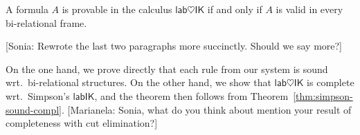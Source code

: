 \documentclass[twoside]{aiml18}
\newcommand{\marianela}[1]{{\color{purple}[Marianela: #1]}}
\newcommand{\sonia}[1]{{\color{blue}[Sonia: #1]}}
\newcommand*{\lab}{\mathsf{lab}}
\newcommand*{\IK}{\mathsf{IK}}
\newcommand*{\TOP}{\mathord{\top}}
\newcommand*{\BOT}{\mathord{\bot}}
\newcommand*{\labels}[2]{{\color{blue}{#1}\:\colon}{#2}}
\newcommand{\SEQ}{\Rightarrow}
\newcommand*{\DD}{\mathcal{D}}
\newcommand*{\rn}[1]  {\ensuremath{\mathsf{#1}}}
\begin{document}
\begin{theorem}
	\label{thm:sound-compl}
	A formula $A$ is provable in the calculus $\lab\heartsuit\IK$ if and only if $A$ is valid in every bi-relational frame.
\end{theorem}

\sonia{Rewrote the last two paragraphs more succinctly. Should we say more?}

On the one hand, we prove directly that each rule from our system is sound wrt.~bi-relational structures.
%
On the other hand, we show that $\lab\heartsuit\IK$ is complete wrt.~Simpson's $\lab\IK$, and the theorem then follows from Theorem~\ref{thm:simpson-sound-compl}. \marianela{Sonia, what do you think about mention your result of completeness with cut elimination?}

%
%		
%
%
%
%		
%		
\end{document}
